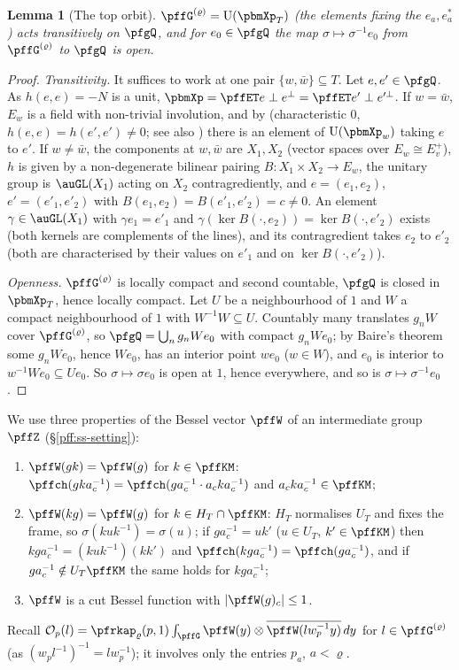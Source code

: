 \documentclass[10pt]{amsart}
\newtheorem{lemma}[theorem]{Lemma}
\theoremstyle{definition}
\theoremstyle{remark}
\providecommand{\auU}{\mathrm U}
\begin{document}
\begin{lemma}[The top orbit]\label{pfg:orbit}
$\pffG^{(\varrho)}=\auU(\pbmXp_T)$ (the elements fixing the $e_a,e^*_a$) acts transitively on $\pfgQ$, and for $e_0\in\pfgQ$ the
map $\sigma\mapsto\sigma^{-1}e_0$ from $\pffG^{(\varrho)}$ to $\pfgQ$ is open.
\end{lemma}
\begin{proof}
\emph{Transitivity.} It suffices to work at one pair $\{w,\bar w\}\subseteq T$. Let $e,e'\in\pfgQ$. As $h(e,e)=-N$ is a unit,
$\pbmXp=\pffET e\perp e^\perp=\pffET e'\perp e'^\perp$. If $w=\bar w$, $E_w$ is a field with non-trivial involution, and by
{\cite[Lemma~7.12(a)]{P51}} (characteristic $0$, $h(e,e)=h(e',e')\ne0$; see also \cite[Chapter~7, Theorem~9.1]{Scharlau}) there is an element of
$\auU(\pbmXp_w)$ taking $e$ to $e'$. If $w\ne\bar w$, the components at $w,\bar w$ are $X_1,X_2$ (vector spaces over
$E_w\cong E^+_v$), $h$ is given by a non-degenerate bilinear pairing $B\colon X_1\times X_2\to E_w$, the unitary group is
$\auGL(X_1)$ acting on $X_2$ contragrediently, and $e=(e_1,e_2)$, $e'=(e'_1,e'_2)$ with $B(e_1,e_2)=B(e'_1,e'_2)=c\ne0$. An
element $\gamma\in\auGL(X_1)$ with $\gamma e_1=e'_1$ and $\gamma(\ker B(\cdot,e_2))=\ker B(\cdot,e'_2)$ exists (both kernels are
complements of the lines), and its contragredient takes $e_2$ to $e'_2$ (both are characterised by their values on
$e'_1$ and on $\ker B(\cdot,e'_2)$).

\emph{Openness.} $\pffG^{(\varrho)}$ is locally compact and second countable, $\pfgQ$ is closed in $\pbmXp_T$, hence locally
compact. Let $U$ be a neighbourhood of $1$ and $W$ a compact neighbourhood of $1$ with $W^{-1}W\subseteq U$. Countably many
translates $g_nW$ cover $\pffG^{(\varrho)}$, so $\pfgQ=\bigcup_ng_nWe_0$ with compact $g_nWe_0$; by Baire's theorem some $g_nWe_0$,
hence $We_0$, has an interior point $we_0$ ($w\in W$), and $e_0$ is interior to $w^{-1}We_0\subseteq Ue_0$. So $\sigma\mapsto
\sigma e_0$ is open at $1$, hence everywhere, and so is $\sigma\mapsto\sigma^{-1}e_0$.
\end{proof}

We use three properties of the Bessel vector $\pffW$ of an intermediate group $\pffZ$ (\S\ref{pff:ss-setting}):
\begin{enumerate}
\item[(W1)] $\pffW(gk)=\pffW(g)$ for $k\in\pffKM$: $\pffch(gka_c^{-1})=\pffch(ga_c^{-1}\cdot a_cka_c^{-1})$ and $a_cka_c^{-1}\in\pffKM$;
\item[(W2)] $\pffW(kg)=\pffW(g)$ for $k\in H_T\cap\pffKM$: $H_T$ normalises $U_T$ and fixes the frame, so $\sigma(kuk^{-1})=\sigma(u)$;
if $ga_c^{-1}=uk'$ ($u\in U_T$, $k'\in\pffKM$) then $kga_c^{-1}=(kuk^{-1})(kk')$ and $\pffch(kga_c^{-1})=\pffch(ga_c^{-1})$, and if
$ga_c^{-1}\notin U_T\pffKM$ the same holds for $kga_c^{-1}$;
\item[(W3)] $\pffW$ is a cut Bessel function with $|\pffW(g)_c|\le1$.
\end{enumerate}
Recall $\mathcal O_p(l)=\pfrkap_\varrho(p,1)\int_{\pffG}\pffW(y)\otimes\overline{\pffW(lw_p^{-1}y)}\,dy$ for $l\in\pffG^{(\varrho)}$
(as $(w_pl^{-1})^{-1}=lw_p^{-1}$); it involves only the entries $p_a$, $a<\varrho$.
\end{document}
